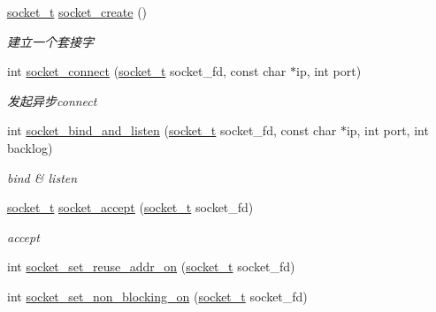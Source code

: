 \begin{DoxyCompactItemize}
\item 
\hyperlink{a00066_a0d9e0afbf02fb6ed6c5b1415dce51b05_a0d9e0afbf02fb6ed6c5b1415dce51b05}{socket\+\_\+t} \hyperlink{a00099_a71cc84510563a2981ed5a47f86ccb7f6_a71cc84510563a2981ed5a47f86ccb7f6}{socket\+\_\+create} ()
\begin{DoxyCompactList}\small\item\em 建立一个套接字 \end{DoxyCompactList}\item 
int \hyperlink{a00099_a1ec48de5c316491b068fbb3c76b21c91_a1ec48de5c316491b068fbb3c76b21c91}{socket\+\_\+connect} (\hyperlink{a00066_a0d9e0afbf02fb6ed6c5b1415dce51b05_a0d9e0afbf02fb6ed6c5b1415dce51b05}{socket\+\_\+t} socket\+\_\+fd, const char $\ast$ip, int port)
\begin{DoxyCompactList}\small\item\em 发起异步connect \end{DoxyCompactList}\item 
int \hyperlink{a00099_a5ab6846ac2d5706e2357ee17a0178bc3_a5ab6846ac2d5706e2357ee17a0178bc3}{socket\+\_\+bind\+\_\+and\+\_\+listen} (\hyperlink{a00066_a0d9e0afbf02fb6ed6c5b1415dce51b05_a0d9e0afbf02fb6ed6c5b1415dce51b05}{socket\+\_\+t} socket\+\_\+fd, const char $\ast$ip, int port, int backlog)
\begin{DoxyCompactList}\small\item\em bind \& listen \end{DoxyCompactList}\item 
\hyperlink{a00066_a0d9e0afbf02fb6ed6c5b1415dce51b05_a0d9e0afbf02fb6ed6c5b1415dce51b05}{socket\+\_\+t} \hyperlink{a00099_a3db4aef68a8961e075d700673594f9d3_a3db4aef68a8961e075d700673594f9d3}{socket\+\_\+accept} (\hyperlink{a00066_a0d9e0afbf02fb6ed6c5b1415dce51b05_a0d9e0afbf02fb6ed6c5b1415dce51b05}{socket\+\_\+t} socket\+\_\+fd)
\begin{DoxyCompactList}\small\item\em accept \end{DoxyCompactList}\item 
int \hyperlink{a00099_a10039d2f0e29d4b0d3b0cab3c7a1b63c_a10039d2f0e29d4b0d3b0cab3c7a1b63c}{socket\+\_\+set\+\_\+reuse\+\_\+addr\+\_\+on} (\hyperlink{a00066_a0d9e0afbf02fb6ed6c5b1415dce51b05_a0d9e0afbf02fb6ed6c5b1415dce51b05}{socket\+\_\+t} socket\+\_\+fd)
\item 
int \hyperlink{a00099_afd473c5857939c252deb9bfa30da8366_afd473c5857939c252deb9bfa30da8366}{socket\+\_\+set\+\_\+non\+\_\+blocking\+\_\+on} (\hyperlink{a00066_a0d9e0afbf02fb6ed6c5b1415dce51b05_a0d9e0afbf02fb6ed6c5b1415dce51b05}{socket\+\_\+t} socket\+\_\+fd)

\end{DoxyCompactItemize}
